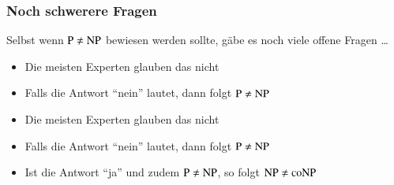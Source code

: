 \documentclass[aspectratio=1610,onlymath]{beamer}
\begin{document}
\begin{frame}\frametitle{Noch schwerere Fragen}

Selbst wenn ${\textsc{P}}\neq{\textsc{NP}}$ bewiesen werden sollte, gäbe es noch viele
offene Fragen \ldots\bigskip\pause

%
\begin{itemize}
\item Die meisten Experten glauben das nicht
\item Falls die Antwort "`nein"' lautet, dann folgt ${\textsc{P}}\neq{\textsc{NP}}$
\end{itemize}\bigskip\pause

%
\begin{itemize}
\item Die meisten Experten glauben das nicht
\item Falls die Antwort "`nein"' lautet, dann folgt ${\textsc{P}}\neq{\textsc{NP}}$
\item Ist die Antwort "`ja"' und zudem ${\textsc{P}}\neq{\textsc{NP}}$, so folgt ${\textsc{NP}}\neq{\textsc{coNP}}$
\end{itemize}\bigskip

\end{frame}
\end{document}
